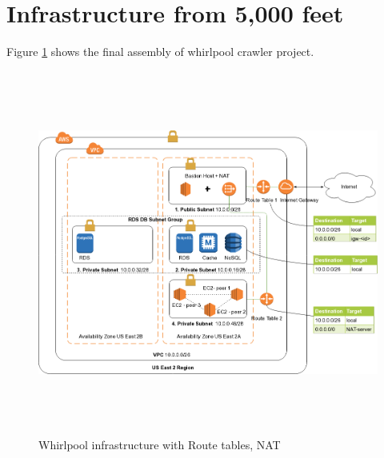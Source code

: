 \section{Infrastructure from 5,000 feet}
Figure \ref{fig:infra5k} shows the final assembly of whirlpool crawler project. 
\begin{figure}[h!]
  \centering
  \includegraphics[width=20cm,height=12cm,keepaspectratio]{../media/crawler/aws-deploy-5k-feet.png}
  \caption{Whirlpool infrastructure with Route tables, NAT}
  \label{fig:infra5k}
\end{figure}

